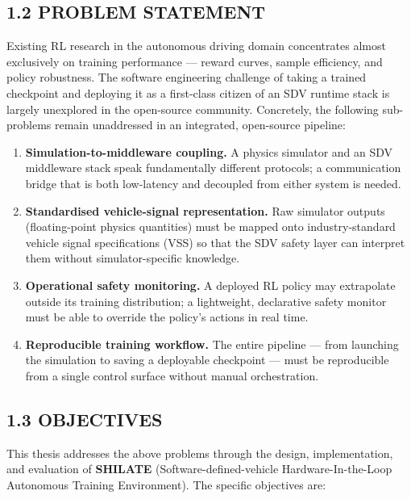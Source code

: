 \documentclass[12pt,a4paper]{article}
\begin{document}
\subsection*{1.2 \quad PROBLEM STATEMENT}

\indent Existing RL research in the autonomous driving domain concentrates
almost exclusively on training performance --- reward curves, sample efficiency,
and policy robustness. The software engineering challenge of taking a trained
checkpoint and deploying it as a first-class citizen of an SDV runtime stack is
largely unexplored in the open-source community. Concretely, the following
sub-problems remain unaddressed in an integrated, open-source pipeline:

\begin{enumerate}[leftmargin=2.5cm, label=\textbf{P\arabic*.}]
  \item \textbf{Simulation-to-middleware coupling.} A physics simulator and an
    SDV middleware stack speak fundamentally different protocols; a
    communication bridge that is both low-latency and decoupled from either
    system is needed.
  \item \textbf{Standardised vehicle-signal representation.} Raw simulator
    outputs (floating-point physics quantities) must be mapped onto
    industry-standard vehicle signal specifications (VSS) so that the SDV
    safety layer can interpret them without simulator-specific knowledge.
  \item \textbf{Operational safety monitoring.} A deployed RL policy may
    extrapolate outside its training distribution; a lightweight, declarative
    safety monitor must be able to override the policy's actions in real time.
  \item \textbf{Reproducible training workflow.} The entire pipeline --- from
    launching the simulation to saving a deployable checkpoint --- must be
    reproducible from a single control surface without manual orchestration.
\end{enumerate}

\subsection*{1.3 \quad OBJECTIVES}

\indent This thesis addresses the above problems through the design, implementation, and
evaluation of \textbf{SHILATE} (Software-defined-vehicle Hardware-In-the-Loop
Autonomous Training Environment). The specific objectives are:
\end{document}
